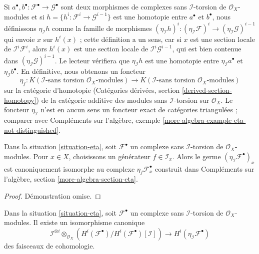 {\medskip\noindent

Si $a^\bullet, b^\bullet : \mathcal{F}^\bullet \to \mathcal{G}^\bullet$
sont deux morphismes de complexes sans $\mathcal{I}$-torsion de $\mathcal{O}_X$-modules et si $h = \{h^i : \mathcal{F}^i \to \mathcal{G}^{i - 1}\}$ est une homotopie entre $a^\bullet$ et $b^\bullet$, nous définissons
$\eta_\mathcal{I}h$ comme la famille de morphismes
$(\eta_\mathcal{I}h)^i : (\eta_\mathcal{I}\mathcal{F})^i \to
(\eta_\mathcal{I}\mathcal{G})^{i - 1}$
qui envoie $x$ sur $h^i(x)$ ; cette définition a un sens, car si
$x$ est une section locale de $\mathcal{I}^i\mathcal{F}^i$,
alors $h^i(x)$ est une section locale de $\mathcal{I}^i\mathcal{G}^{i - 1}$,
qui est bien contenue dans $(\eta_\mathcal{I}\mathcal{G})^{i - 1}$. Le lecteur vérifiera que $\eta_\mathcal{I}h$ est une homotopie entre $\eta_\mathcal{I}a^\bullet$ et $\eta_\mathcal{I}b^\bullet$. En définitive, nous obtenons un foncteur
$$
\eta_f :
K(\mathcal{I}\text{-sans torsion }\mathcal{O}_X\text{-modules})
\longrightarrow
K(\mathcal{I}\text{-sans torsion }\mathcal{O}_X\text{-modules})
$$
sur la catégorie d'homotopie (Catégories dérivées, section \ref{derived-section-homotopy}) de la catégorie additive des modules sans
$\mathcal{I}$-torsion sur $\mathcal{O}_X$. Le foncteur $\eta_\mathcal{I}$ n'est en aucun sens un foncteur exact de catégories triangulées ; comparer avec Compléments sur l'algèbre, exemple \ref{more-algebra-example-eta-not-distinguished}.

\begin{lemma}

\label{lemma-eta-stalks}
Dans la situation \ref{situation-eta}, soit $\mathcal{F}^\bullet$ un complexe sans $\mathcal{I}$-torsion de $\mathcal{O}_X$-modules. Pour $x \in X$, choisissons un générateur $f \in \mathcal{I}_x$. Alors le germe $(\eta_\mathcal{I}\mathcal{F}^\bullet)_x$ est canoniquement isomorphe au complexe $\eta_f\mathcal{F}^\bullet_x$ construit dans Compléments sur l'algèbre, section \ref{more-algebra-section-eta}.
\end{lemma}

\begin{proof}
Démonstration omise.
\end{proof}

\begin{lemma}

\label{lemma-eta-first-property}

Dans la situation \ref{situation-eta},
soit $\mathcal{F}^\bullet$ un complexe sans
$\mathcal{I}$-torsion de $\mathcal{O}_X$-modules. Il existe un isomorphisme canonique
$$
\mathcal{I}^{\otimes i} \otimes_{\mathcal{O}_X}
\left(
H^i(\mathcal{F}^\bullet)/H^i(\mathcal{F}^\bullet)[\mathcal{I}]
\right)
\longrightarrow H^i(\eta_\mathcal{I}\mathcal{F}^\bullet)
$$
des faisceaux de cohomologie.


\end{lemma}}
